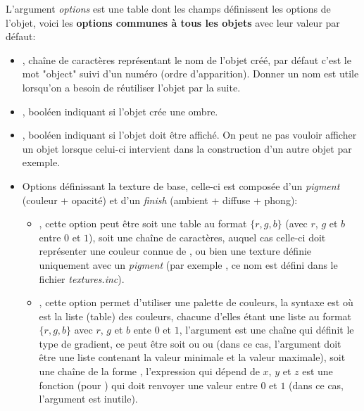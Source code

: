 L'argument \emph{options} est une table dont les champs définissent les options de l'objet, voici les \textbf{options communes à tous les objets} avec leur valeur par défaut:
\begin{itemize}
    \item {}, chaîne de caractères représentant le nom de l'objet créé, par défaut c'est le mot "object" suivi d'un numéro (ordre d'apparition). Donner un nom est utile lorsqu'on a besoin de réutiliser l'objet par la suite.
    
    \item {}, booléen indiquant si l'objet crée une ombre.
    
    \item {}, booléen indiquant si l'objet doit être affiché. On peut ne pas vouloir afficher un objet lorsque celui-ci intervient dans la construction d'un autre objet par exemple.
    
    \item Options définissant la texture de base, celle-ci est composée d'un \emph{pigment} (couleur + opacité) et d'un \emph{finish} (ambient + diffuse + phong):
        \begin{itemize}
            \item {}, cette option peut être soit une table au format $\{r,g,b\}$ (avec $r$, $g$ et $b$ entre $0$ et $1$), soit une chaîne de caractères, auquel cas celle-ci doit représenter une couleur connue de \povray, ou bien une texture définie uniquement avec un \emph{pigment} (par exemple , ce nom est défini dans le fichier \emph{textures.inc}).
            
            \item {}, cette option permet d'utiliser une palette de couleurs, la syntaxe est  où  est la liste (table) des couleurs, chacune d'elles étant une liste au format $\{r,g,b\}$ avec $r$, $g$ et $b$ ente $0$ et $1$, l'argument  est une chaîne qui définit le type de gradient, ce peut être soit  ou  ou  (dans ce cas, l'argument  doit être une liste contenant la valeur minimale et la valeur maximale), soit une chaîne de la forme , l'expression qui dépend de $x$, $y$ et $z$ est une fonction (pour \povray) qui doit renvoyer une valeur entre $0$ et $1$ (dans ce cas, l'argument  est inutile).
            

\end{itemize}
\end{itemize}
